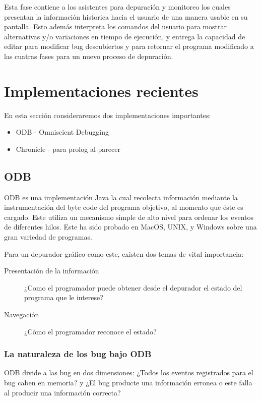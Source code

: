 \documentclass[12pt,legalpaper]{report}
\begin{document}
Esta fase contiene a los asistentes para depuración y monitoreo los cuales presentan la información historica hacia el usuario de una manera usable en su pantalla.  Esto además interpreta los comandos del usuario para mostrar alternativas y/o variaciones en tiempo de ejecución, y entrega la capacidad de editar para modificar bug descubiertos y para retornar el programa modificado a las cuatras fases para un nuevo proceso de depuración.


	\section{Implementaciones recientes}

En esta sección consideraremos dos implementaciones importantes:
\begin{itemize}
	\item ODB - Omniscient Debugging
	\item Chronicle - para prolog al parecer
\end{itemize}

		\subsection{ODB}

ODB es una implementación Java la cual recolecta información mediante la instrumentación del byte code del programa objetivo, al momento que éste es cargado.  Este utiliza un mecanismo simple de alto nivel para ordenar los eventos de diferentes hilos.  Este ha sido probado en MacOS, UNIX, y Windows sobre una gran variedad de programas.

Para un depurador gráfico como este, existen dos temas de vital importancia:
\begin{description}
	\item[Presentación de la información] ¿Como el programador puede obtener desde el depurador el estado del programa que le interese?
	\item[Navegación] ¿Cómo el programador reconoce el estado?
\end{description} 

			\subsubsection{La naturaleza de los bug bajo ODB}

ODB divide a las bug en dos dimensiones:  ¿Todos los eventos registrados para el bug caben en memoria? y ¿El bug producte una información erronea o este falla al producir una información correcta?
\end{document}
